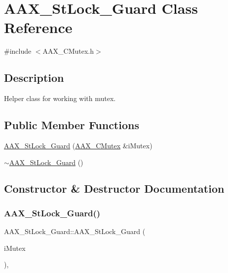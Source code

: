 \hypertarget{a01505}{}\section{A\+A\+X\+\_\+\+St\+Lock\+\_\+\+Guard Class Reference}
\label{a01505}


{\ttfamily \#include $<$A\+A\+X\+\_\+\+C\+Mutex.\+h$>$}



\subsection{Description}
Helper class for working with mutex. \subsection*{Public Member Functions}
\begin{DoxyCompactItemize}
\item 
\mbox{\hyperlink{a01505_abe7e3ad1ebe9ce3275abc7b23aba32d8}{A\+A\+X\+\_\+\+St\+Lock\+\_\+\+Guard}} (\mbox{\hyperlink{a01501}{A\+A\+X\+\_\+\+C\+Mutex}} \&i\+Mutex)
\item 
\mbox{\hyperlink{a01505_abdc2e6d3f8de54078bbb823e742bb5fc}{$\sim$\+A\+A\+X\+\_\+\+St\+Lock\+\_\+\+Guard}} ()
\end{DoxyCompactItemize}


\subsection{Constructor \& Destructor Documentation}
\mbox{\label{a01505_abe7e3ad1ebe9ce3275abc7b23aba32d8}} 
\subsubsection{\texorpdfstring{AAX\_StLock\_Guard()}{AAX\_StLock\_Guard()}}
{\footnotesize\ttfamily A\+A\+X\+\_\+\+St\+Lock\+\_\+\+Guard\+::\+A\+A\+X\+\_\+\+St\+Lock\+\_\+\+Guard (\begin{DoxyParamCaption}\item[{\mbox{\hyperlink{a01501}{A\+A\+X\+\_\+\+C\+Mutex}} \&}]{i\+Mutex }\end{DoxyParamCaption})\hspace{0.3cm}{\ttfamily [inline]}, {\ttfamily [explicit]}}



